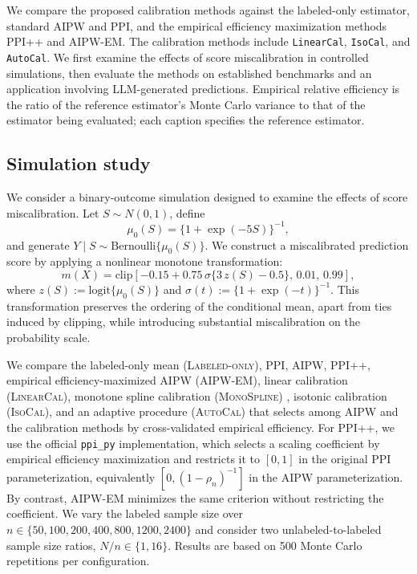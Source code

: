 \documentclass{article}
\theoremstyle{plain}
\theoremstyle{definition}
\newcommand{\1}{\mathbbm{1}}
\begin{document}
We compare the proposed calibration methods against the
labeled-only estimator, standard AIPW and PPI, and the
empirical efficiency maximization methods PPI++ and
\textsc{AIPW-EM}. The calibration methods include
\texttt{LinearCal}, \texttt{IsoCal}, and \texttt{AutoCal}.
We first examine the effects of score miscalibration in
controlled simulations, then evaluate the methods on
established benchmarks and an application involving
LLM-generated predictions.
Empirical relative efficiency is the ratio of the reference estimator's
Monte Carlo variance to that of the estimator being evaluated; each caption
specifies the reference estimator.

\subsection{Simulation study}
\label{sec:simulation}

We consider a binary-outcome simulation designed to examine the
effects of score miscalibration. Let $S\sim N(0,1)$, define
\[
\mu_0(S)=\{1+\exp(-5S)\}^{-1},
\]
and generate $Y\mid S\sim\mathrm{Bernoulli}\{\mu_0(S)\}$.
We construct a miscalibrated prediction score by applying
a nonlinear monotone transformation:
\[
m(X)=\mathrm{clip}\left[
-0.15+0.75\,\sigma\bigl\{3\,z(S)-0.5\bigr\},
\,0.01,\,0.99
\right],
\]
where $z(S):=\mathrm{logit}\{\mu_0(S)\}$ and
$\sigma(t):=\{1+\exp(-t)\}^{-1}$.
This transformation preserves the ordering of the conditional
mean, apart from ties induced by clipping, while introducing
substantial miscalibration on the probability scale.

We compare the labeled-only mean (\textsc{Labeled-only}),
PPI, AIPW, PPI++, empirical efficiency-maximized AIPW
(\textsc{AIPW-EM}), linear calibration (\textsc{LinearCal}),
monotone spline calibration (\textsc{MonoSpline})
\citep{ramsay1988monotone,jiang2011smooth}, isotonic calibration
(\textsc{IsoCal}), and an adaptive procedure (\textsc{AutoCal})
that selects among AIPW and the calibration methods by
cross-validated empirical efficiency. For PPI++, we use
the official \texttt{ppi\_py} implementation, which selects
a scaling coefficient by empirical efficiency maximization
and restricts it to $[0,1]$ in the original PPI parameterization,
equivalently $[0,(1-\rho_n)^{-1}]$ in the AIPW parameterization.
By contrast, \textsc{AIPW-EM} minimizes the same criterion
without restricting the coefficient. We vary the labeled
sample size over $n\in\{50,100,200,400,800,1200,2400\}$
and consider two unlabeled-to-labeled sample size ratios,
$N/n\in\{1,16\}$. Results are based on 500 Monte Carlo
repetitions per configuration.
\end{document}
